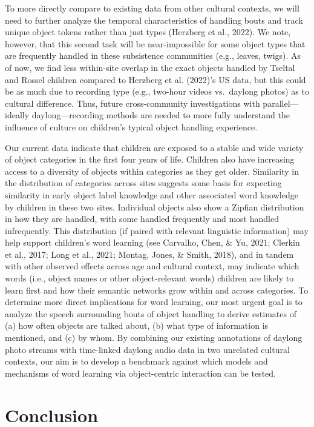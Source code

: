 \documentclass[10pt, letterpaper]{article}
\begin{document}
To more directly compare to existing data from other cultural contexts,
we will need to further analyze the temporal characteristics of handling
bouts and track unique object tokens rather than just types (Herzberg et
al., 2022). We note, however, that this second task will be
near-impossible for some object types that are frequently handled in
these subsistence communities (e.g., leaves, twigs). As of now, we find
less within-site overlap in the exact objects handled by Tseltal and
Rossel children compared to Herzberg et al. (2022)'s US data, but this
could be as much due to recording type (e.g., two-hour videos
vs.~daylong photos) as to cultural difference. Thus, future
cross-community investigations with parallel---ideally
daylong---recording methods are needed to more fully understand the
influence of culture on children's typical object handling experience.

Our current data indicate that children are exposed to a stable and wide
variety of object categories in the first four years of life. Children
also have increasing access to a diversity of objects within categories
as they get older. Similarity in the distribution of categories across
sites suggests some basis for expecting similarity in early object label
knowledge and other associated word knowledge by children in these two
sites. Individual objects also show a Zipfian distribution in how they
are handled, with some handled frequently and most handled infrequently.
This distribution (if paired with relevant linguistic information) may
help support children's word learning (see Carvalho, Chen, \& Yu, 2021;
Clerkin et al., 2017; Long et al., 2021; Montag, Jones, \& Smith, 2018),
and in tandem with other observed effects across age and cultural
context, may indicate which words (i.e., object names or other
object-relevant words) children are likely to learn first and how their
semantic networks grow within and across categories. To determine more
direct implications for word learning, our most urgent goal is to
analyze the speech surrounding bouts of object handling to derive
estimates of (a) how often objects are talked about, (b) what type of
information is mentioned, and (c) by whom. By combining our existing
annotations of daylong photo streams with time-linked daylong audio data
in two unrelated cultural contexts, our aim is to develop a benchmark
against which models and mechanisms of word learning via object-centric
interaction can be tested.

\hypertarget{conclusion}{%
\section{Conclusion}\label{conclusion}}
\end{document}
